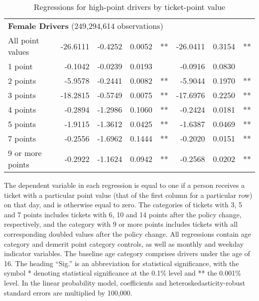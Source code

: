 \begin{table}
\begin{tabular}{l r r r l r r l}
\hline 

\multicolumn{7}{l}{\textbf{Female Drivers} (249,294,614 observations)} \\ 

All point values                &  -26.6111       &  -0.4252        &  0.0052       &   **       &  -26.0411        &  0.3154       &   **       \\ 
1 point                         &  -0.1042       &  -0.0239        &  0.0193       &            &  -0.0916        &  0.0830       &            \\ 
2 points                        &  -5.9578       &  -0.2441        &  0.0082       &   **       &  -5.9044        &  0.1970       &   **       \\ 
3 points                        &  -18.2815       &  -0.5749        &  0.0075       &   **       &  -17.6976        &  0.2250       &   **       \\ 
4 points                        &  -0.2894       &  -1.2986        &  0.1060       &   **       &  -0.2424        &  0.0181       &   **       \\ 
5 points                        &  -1.9115       &  -1.3612        &  0.0425       &   **       &  -1.6387        &  0.0469       &   **       \\ 
7 points                        &  -0.2556       &  -1.6962        &  0.1444       &   **       &  -0.2020        &  0.0151       &   **       \\ 
9 or more points                &  -0.2922       &  -1.1624        &  0.0942       &   **       &  -0.2568        &  0.0202       &   **       \\ 

\hline 

\end{tabular} 
\caption{Regressions for high-point drivers by ticket-point value} 
%
The dependent variable in each regression 
is equal to one if a person receives a ticket with a particular point value 
(that of the first column for a particular row) on that day, 
and is otherwise equal to zero.
%
The categories of tickets with 3, 5 and 7 points includes tickets  
with 6, 10 and 14 points after the policy change, respectively,  
and the category with 9 or more points includes tickets  
with all corresponding doubled values after the policy change. 
All regressions contain age category and demerit point category controls, 
as well as monthly and weekday indicator variables. 
The baseline age category comprises drivers under the age of 16. 
The heading ``Sig.'' is an abbreviation for statistical significance, with 
the symbol * denoting statistical significance at the 0.1\% level 
and ** the 0.001\% level. 
In the linear probability model, coefficients and heteroskedasticity-robust standard errors are  
multiplied by 100,000.  
\label{tab:seas_Logit_vs_LPMx100K_high_pt_regs_by_points} 
\end{table} 
 
